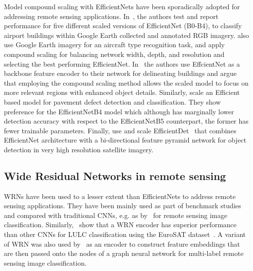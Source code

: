 \documentclass[journal]{IEEEtran}
\begin{document}
 Model compound scaling with EfficientNets have been sporadically adopted for addressing remote sensing applications. In~\cite{9454686}, the authors test and report performance for five different scaled versions of EfficientNet (B0-B4), to classify airport buildings within Google Earth collected and annotated RGB imagery. \cite{WU2020106132} also use Google Earth imagery for an aircraft type recognition task, and apply compound scaling for balancing network width, depth, and resolution and selecting the best performing EfficientNet. In~\cite{isprs-archives-XLIII-B2-2020-731-2020} the authors use EffcientNet as a backbone feature encoder to their network for delineating buildings and argue that employing the compound scaling method allows the scaled model to focus on more relevant regions with enhanced object details. Similarly, \cite{rs14010106} scale an Efficient based model for pavement defect detection and classification. They show preference for the EfficientNetB4 model which although has marginally lower detection accuracy with respect to the EfficientNetB5 counterpart, the former has fewer trainable parameters. Finally, \cite{rs14030516} use and scale EfficientDet~\cite{tan2020efficientdet} that combines EfficientNet architecture with a bi-directional feature pyramid network for object detection in very high resolution satellite imagery.

\subsection{Wide Residual Networks in remote sensing}
 WRNs have been used to a lesser extent than EfficientNets to address remote sensing applications. They have been mainly used as part of benchmark studies and compared with traditional CNNs, e.g. as by~\cite{https://doi.org/10.48550/arxiv.2001.09614} for remote sensing image classification. Similarly,~\cite{s21238083} show that a WRN encoder has superior performance than other CNNs for LULC classification using the EuroSAT dataset~\citep{helber2019eurosat}. A variant of WRN was also used by~\cite{9173783} as an encoder to construct feature embeddings that are then passed onto the nodes of a graph neural network for multi-label remote sensing image classification. 
\end{document}
